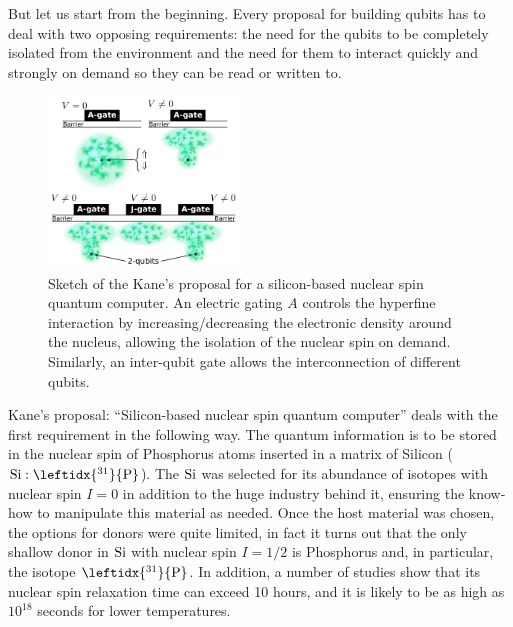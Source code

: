 But let us start from the beginning. Every proposal for building qubits has to deal with two opposing requirements: the need for the qubits to be completely isolated from the environment and the need for them to interact quickly and strongly on demand so they can be read or written to.
\begin{figure}
\centering
\vspace{-10pt}
\includegraphics[width=0.45\textwidth]{introduction/figures/kane.pdf}
\vspace{-7pt}
\caption{Sketch of the Kane's proposal for a silicon-based nuclear spin quantum computer. An electric gating $A$ controls the hyperfine interaction by increasing/decreasing the electronic density around the nucleus, allowing the isolation of the nuclear spin on demand. Similarly, an inter-qubit gate allows the interconnection of different qubits.}
\label{kane_proposal}
\end{figure}
\FloatBarrier
Kane's proposal: ``Silicon-based nuclear spin quantum computer'' deals with the first requirement in the following way. The quantum information is to be stored in the nuclear spin of Phosphorus atoms inserted in a matrix of Silicon ($\ce{Si}:\leftidx{^{31}}{\ce{P}}$). The $\ce{Si}$ was selected for its abundance of isotopes with nuclear spin $I=0$ in addition to the huge industry behind it, ensuring the know-how to manipulate this material as needed. Once the host material was chosen, the options for donors were quite limited, in fact it turns out that the only shallow donor in $\ce{Si}$ with nuclear spin $I=1/2$ is Phosphorus and, in particular, the isotope $\leftidx{^{31}}{\ce{P}}$. In addition, a number of studies\cite{Feher1959, Wilson1961, Waugh1988} show that its nuclear spin relaxation time can exceed 10 hours, and it is likely to be as high as $10^{18}$ seconds for lower temperatures. %

